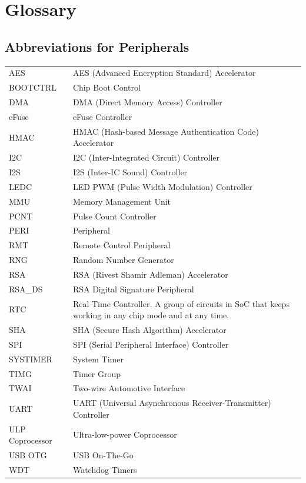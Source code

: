 \section*{Glossary}\label{glossary}
\rhead{\Navigation}

\subsection*{Abbreviations for Peripherals}

\begin{longtable}[c]{ R{3cm} p{12cm} }

AES     & AES (Advanced Encryption Standard) Accelerator \\
BOOTCTRL & Chip Boot Control \\
DMA     & DMA (Direct Memory Access) Controller \\
eFuse   & eFuse Controller \\
HMAC    & HMAC (Hash-based Message Authentication Code) Accelerator \\
I2C     & I2C (Inter-Integrated Circuit) Controller \\
I2S     & I2S (Inter-IC Sound) Controller \\
LEDC    & LED PWM (Pulse Width Modulation) Controller \\
MMU    & Memory Management Unit \\
PCNT & Pulse Count Controller \\
PERI  & Peripheral \\
RMT     & Remote Control Peripheral \\
RNG     & Random Number Generator \\
RSA     & RSA (Rivest Shamir Adleman) Accelerator \\
RSA\_DS & RSA Digital Signature Peripheral\\
RTC   & Real Time Controller. A group of circuits in SoC that keeps working in any chip mode and at any time.  \\
SHA     & SHA (Secure Hash Algorithm) Accelerator \\
SPI     & SPI (Serial Peripheral Interface) Controller \\
SYSTIMER & System Timer \\
TIMG    & Timer Group \\
TWAI    & Two-wire Automotive Interface \\
UART    & UART (Universal Asynchronous Receiver-Transmitter) Controller \\
ULP Coprocessor & Ultra-low-power Coprocessor \\
USB OTG & USB On-The-Go \\
WDT & Watchdog Timers \\

\end{longtable}




